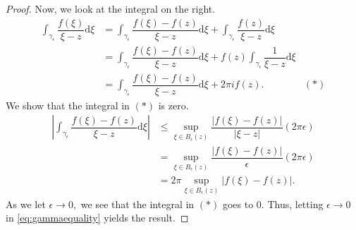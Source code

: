 \begin{proof}
	Now, we look at the integral on the right.
	\begin{align*} 
		\int_{\gamma_\epsilon}^{} \dfrac{f(\xi)}{\xi - z} \mathrm{d}\xi &= \int_{\gamma_\epsilon}^{} \dfrac{f(\xi) - f(z)}{\xi - z} \mathrm{d}\xi + \int_{\gamma_\epsilon}^{} \dfrac{f(z)}{\xi - z} \mathrm{d}\xi\\
		&= \int_{\gamma_\epsilon}^{} \dfrac{f(\xi) - f(z)}{\xi - z} \mathrm{d}\xi + f(z)\int_{\gamma_\epsilon}^{} \dfrac{1}{\xi - z} \mathrm{d}\xi\\
		&= \int_{\gamma_\epsilon}^{} \dfrac{f(\xi) - f(z)}{\xi - z} \mathrm{d}\xi + 2\pi if(z). & (*)
	\end{align*}
	We show that the integral in $(*)$ is zero.
	\begin{align*} 
		\left|\int_{\gamma_\epsilon}^{} \dfrac{f(\xi) - f(z)}{\xi - z} \mathrm{d}\xi\right| &\le \sup_{\xi\in B_\epsilon(z)}\dfrac{|f(\xi) - f(z)|}{|\xi - z|}(2\pi\epsilon)\\
		&=\sup_{\xi\in B_\epsilon(z)}\dfrac{|f(\xi) - f(z)|}{\epsilon}(2\pi\epsilon)\\
		&=2\pi \sup_{\xi\in B_\epsilon(z)}|f(\xi) - f(z)|.
	\end{align*}
	As we let $\epsilon \to 0,$ we see that the integral in $(*)$ goes to $0.$ Thus, letting $\epsilon \to 0$ in \cref{eq:gammaequality} yields the result.
\end{proof}



